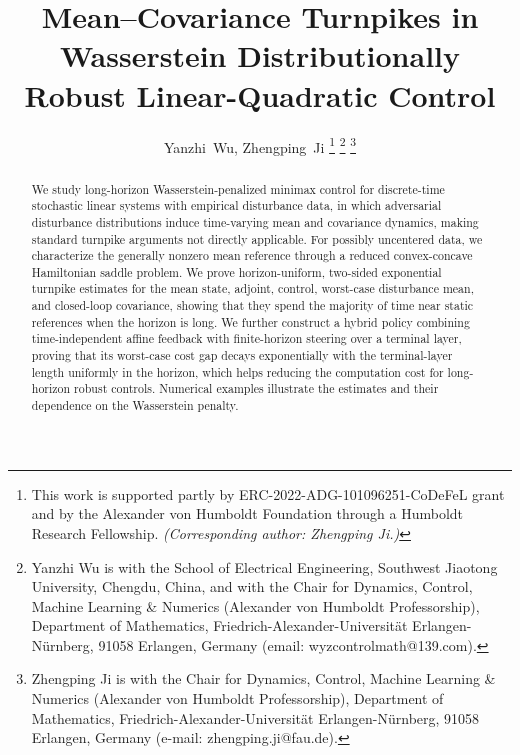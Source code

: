 \documentclass[10pt,journal,twoside]{IEEEtran}
\title{Mean--Covariance Turnpikes in Wasserstein Distributionally Robust Linear-Quadratic Control}
\author{Yanzhi~Wu, Zhengping~Ji%
\thanks{This work is supported partly by ERC-2022-ADG-101096251-CoDeFeL grant and by the Alexander von Humboldt Foundation through a Humboldt Research Fellowship. \textit{(Corresponding author: Zhengping Ji.)}}
\thanks{Yanzhi Wu is with the School of Electrical Engineering, Southwest Jiaotong University, Chengdu, China, and with the Chair for Dynamics, Control, Machine Learning \& Numerics (Alexander von Humboldt Professorship), Department of Mathematics, Friedrich-Alexander-Universit\"at Erlangen-N\"urnberg, 91058 Erlangen, Germany (email: wyzcontrolmath@139.com).}%
\thanks{Zhengping Ji is with the Chair for Dynamics, Control, Machine Learning \& Numerics (Alexander von Humboldt Professorship), Department of Mathematics, Friedrich-Alexander-Universit\"at Erlangen-N\"urnberg, 91058 Erlangen, Germany (e-mail: zhengping.ji@fau.de).}}
\theoremstyle{definition}
\theoremstyle{remark}
\begin{document}
\maketitle


\begin{abstract}
We study long-horizon Wasserstein-penalized minimax control for discrete-time stochastic linear systems with empirical disturbance data, in which adversarial disturbance distributions induce time-varying mean and covariance dynamics, making standard turnpike arguments not directly applicable. For possibly uncentered data, we characterize the generally nonzero mean reference through a reduced convex-concave Hamiltonian saddle problem. We prove horizon-uniform, two-sided exponential turnpike estimates for the mean state, adjoint, control, worst-case disturbance mean, and closed-loop covariance, showing that they spend the majority of time near static references when the horizon is long. We further construct a hybrid policy combining time-independent affine feedback with finite-horizon steering over a terminal layer, proving that its worst-case cost gap decays exponentially with the terminal-layer length uniformly in the horizon, which helps reducing the computation cost for long-horizon robust controls. Numerical examples illustrate the estimates and their
dependence on the Wasserstein penalty.


\end{abstract}
\end{document}
